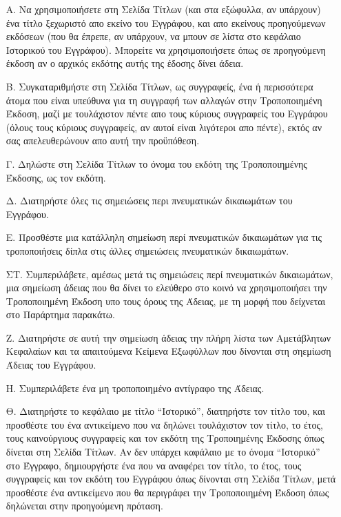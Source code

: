 \begin{itemize}
\item[A.] 
   Να χρησιμοποιήσετε στη Σελίδα Τίτλων (και στα εξώφυλλα, αν υπάρχουν) ένα τίτλο ξεχωριστό απο  εκείνο του Εγγράφου, και απο εκείνους προηγούμενων εκδόσεων (που θα έπρεπε, αν υπάρχουν, να μπουν σε λίστα στο κεφάλαιο Ιστορικού του Εγγράφου). Μπορείτε να χρησιμοποιήσετε όπως σε προηγούμενη έκδοση αν ο αρχικός εκδότης αυτής της έδοσης δίνει άδεια.
   
\item[B.]
   Συγκαταριθμήστε στη Σελίδα Τίτλων, ως συγγραφείς, ένα ή περισσότερα άτομα που είναι υπεύθυνα για τη συγγραφή των αλλαγών στην Τροποποιημένη Έκδοση, μαζί με τουλάχιστον πέντε απο τους κύριους συγγραφείς του Εγγράφου (όλους τους κύριους συγγραφείς, αν αυτοί είναι λιγότεροι απο πέντε), εκτός αν σας απελευθερώνουν απο αυτή την προϋπόθεση.
   
\item[Γ.]
   Δηλώστε στη Σελίδα Τίτλων το όνομα του εκδότη της Τροποποιημένης Έκδοσης, ως τον εκδότη.
   
\item[Δ.]
   Διατηρήστε όλες τις σημειώσεις περι πνευματικών δικαιωμάτων του Εγγράφου.
   
\item[E.]
   Προσθέστε μια κατάλληλη σημείωση περί πνευματικών δικαιωμάτων για τις τροποποιήσεις δίπλα στις άλλες σημειώσεις πνευματικών δικαιωμάτων.
   
\item[ΣΤ.]
   Συμπεριλάβετε, αμέσως μετά τις σημειώσεις περί πνευματικών δικαιωμάτων, μια σημείωση άδειας που θα δίνει το ελεύθερο στο κοινό να χρησιμοποιήσει την Τροποποιημένη Έκδοση υπο τους όρους της Άδειας, με τη μορφή που δείχνεται στο Παράρτημα παρακάτω.
   
\item[Ζ.]
   Διατηρήστε σε αυτή την σημείωση άδειας την πλήρη λίστα των Αμετάβλητων Κεφαλαίων και τα απαιτούμενα Κείμενα Εξωφύλλων που δίνονται στη σηεμίωση Άδειας του Εγγράφου.
   
\item[Η.]
   Συμπεριλάβετε ένα μη τροποποιημένο αντίγραφο της Άδειας.
   
\item[Θ.]
   Διατηρήστε το κεφάλαιο με τίτλο “Ιστορικό”, διατηρήστε τον τίτλο του, και προσθέστε του ένα αντικείμενο που να δηλώνει τουλάχιστον τον τίτλο, το έτος, τους καινούργιους συγγραφείς και τον εκδότη της Τροποιημένης Έκδοσης όπως δίνεται στη Σελίδα Τίτλων. Αν δεν υπάρχει καφάλαιο με το όνομα “Ιστορικό” στο Έγγραφο, δημιουργήστε ένα που να αναφέρει τον τίτλο, το έτος, τους συγγραφείς και τον εκδότη του Εγγράφου όπως δίνονται στη Σελίδα Τίτλων, μετά προσθέστε ένα αντικείμενο που θα περιγράφει την Τροποποιημένη Έκδοση όπως δηλώνεται στην προηγούμενη πρόταση. 
   

\end{itemize}

